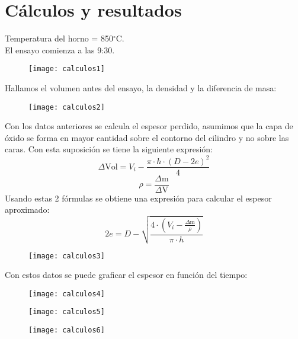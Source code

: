 \documentclass[a4paper,12pt]{report}
\begin{document}
\chapter{Cálculos y resultados}
Temperatura del horno = 850$^{\circ}$C.\\
El ensayo comienza a las 9:30.
\begin{figure}[H]
\begin{center}
\texttt{[image: calculos1]}
\end{center}
\end{figure}
\newpage
Hallamos el volumen antes del ensayo, la densidad y la diferencia de masa:
\begin{figure}[H]
\begin{center}
\texttt{[image: calculos2]}
\end{center}
\end{figure}
Con los datos anteriores se calcula el espesor perdido, asumimos que la capa de óxido se forma en mayor cantidad sobre el contorno del cilindro y no sobre las caras. Con esta suposición se tiene la siguiente expresión:
$$
\Delta\mathrm{Vol} = V_{i} - \frac{\pi \cdot h\cdot (D-2e)^{2}}{4}
$$
$$
\rho = \frac{\Delta \mathrm{m}}{\Delta \mathrm{V}}
$$
Usando estas 2 fórmulas se obtiene una expresión para calcular el espesor aproximado:
$$
2e = D - \sqrt{\frac{4 \cdot \left( V_{i}-\frac{\Delta \mathrm{m}}{\rho} \right)}{\pi \cdot h}}
$$
\begin{figure}[H]
\begin{center}
\texttt{[image: calculos3]}
\end{center}
\end{figure}
Con estos datos se puede graficar el espesor en función del tiempo:
\begin{figure}[H]
\begin{center}
\texttt{[image: calculos4]}
\end{center}
\end{figure}
\begin{figure}[H]
\begin{center}
\texttt{[image: calculos5]}
\end{center}
\end{figure}
\begin{figure}[H]
\begin{center}
\texttt{[image: calculos6]}
\end{center}
\end{figure}
\end{document}
